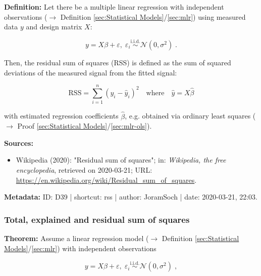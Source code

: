 \documentclass[a4paper,12pt,twoside]{book}
\begin{document}
\textbf{Definition:} Let there be a multiple linear regression with independent observations ($\rightarrow$ Definition \ref{sec:Statistical Models}/\ref{sec:mlr}) using measured data $y$ and design matrix $X$:

\begin{equation} \label{eq:rss-mlr}
y = X\beta + \varepsilon, \; \varepsilon_i \overset{\mathrm{i.i.d.}}{\sim} \mathcal{N}(0, \sigma^2) \; .
\end{equation}

Then, the residual sum of squares (RSS) is defined as the sum of squared deviations of the measured signal from the fitted signal:

\begin{equation} \label{eq:rss-rss}
\mathrm{RSS} = \sum_{i=1}^n (y_i - \hat{y}_i)^2 \quad \text{where} \quad \hat{y} = X \hat{\beta}
\end{equation}

with estimated regression coefficients $\hat{\beta}$, e.g. obtained via ordinary least squares ($\rightarrow$ Proof \ref{sec:Statistical Models}/\ref{sec:mlr-ols}).


\vspace{1em}
\textbf{Sources:}
\begin{itemize}
\item Wikipedia (2020): "Residual sum of squares"; in: \textit{Wikipedia, the free encyclopedia}, retrieved on 2020-03-21; URL: \url{https://en.wikipedia.org/wiki/Residual_sum_of_squares}.
\end{itemize}


\vspace{1em}
\textbf{Metadata:} ID: D39 | shortcut: rss | author: JoramSoch | date: 2020-03-21, 22:03.
\vspace{1em}



\subsubsection[\textbf{Total, explained and residual sum of squares}]{Total, explained and residual sum of squares} \label{sec:mlr-pss}
\setcounter{equation}{0}

\textbf{Theorem:} Assume a linear regression model ($\rightarrow$ Definition \ref{sec:Statistical Models}/\ref{sec:mlr}) with independent observations

\begin{equation} \label{eq:mlr-pss-mlr}
y = X\beta + \varepsilon, \; \varepsilon_i \overset{\mathrm{i.i.d.}}{\sim} \mathcal{N}(0, \sigma^2) \; ,
\end{equation}
\end{document}
